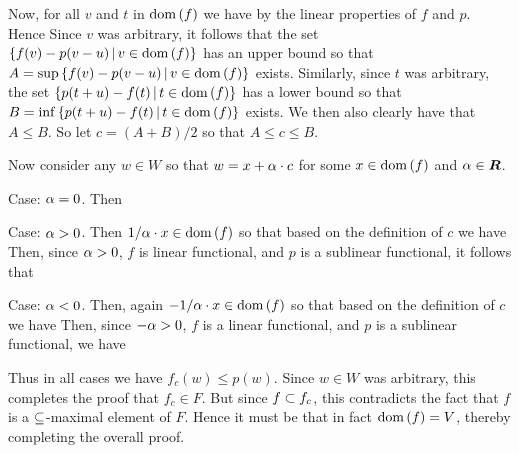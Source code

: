 \begin{questions}
{{    Now, for all $v$ and $t$ in $\dom(f)$ we have
    by the linear properties of $f$ and $p$.
    Hence
    Since $v$ was arbitrary, it follows that the set $\braces{f(v) - p(v-u) \where v \in \dom(f)}$ has an upper bound so that $A = \sup\braces{f(v) - p(v-u) \where v \in \dom(f)}$ exists.
    Similarly, since $t$ was arbitrary, the set $\braces{p(t + u) - f(t) \where t \in \dom(f)}$ has a lower bound so that $B = \inf\braces{p(t + u) - f(t) \where t \in \dom(f)}$ exists.
    We then also clearly have that $A \leq B$.
    So let $c = (A + B) / 2$ so that $A \leq c \leq B$.

    Now consider any $w \in W$ so that $w = x + \a \cdot c$ for some $x \in \dom(f)$ and $\a \in \reals$.

    Case: $\a = 0$.
    Then

    Case: $\a > 0$.
    Then $1/\a \cdot x \in \dom(f)$ so that based on the definition of $c$ we have
    Then, since $\a > 0$, $f$ is linear functional, and $p$ is a sublinear functional, it follows that

    Case: $\a < 0$.
    Then, again $-1/\a \cdot x \in \dom(f)$ so that based on the definition of $c$ we have
    Then, since $-\a > 0$, $f$ is a linear functional, and $p$ is a sublinear functional, we have

    Thus in all cases we have $f_c(w) \leq p(w)$.
    Since $w \in W$ was arbitrary, this completes the proof that $f_c \in F$.
    But since $f \pss f_c$, this contradicts the fact that $f$ is a $\ss$-maximal element of $F$.
    Hence it must be that in fact $\dom(f) = V$, thereby completing the overall proof.
  }
}


\end{questions}
